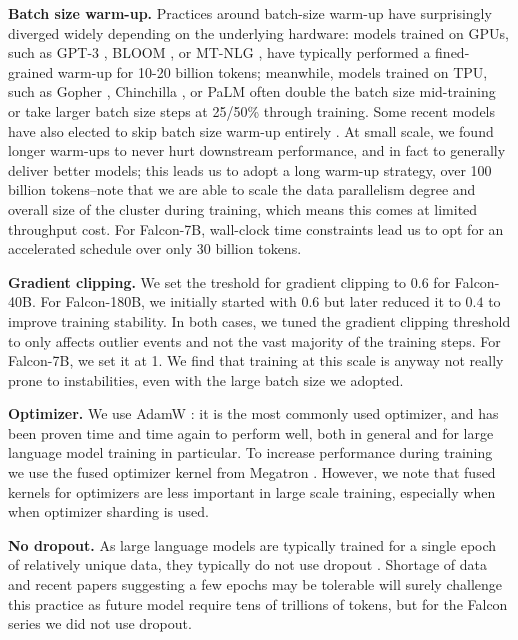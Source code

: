 \documentclass{article}
\begin{document}
\textbf{Batch size warm-up.} Practices around batch-size warm-up have surprisingly diverged widely depending on the underlying hardware: models trained on GPUs, such as GPT-3 \citep{brown2020gpt3}, BLOOM \citep{bloom}, or MT-NLG \citep{smith2022using}, have typically performed a fined-grained warm-up for 10-20 billion tokens; meanwhile, models trained on TPU, such as Gopher \citep{gopher}, Chinchilla \citep{hoffmann2022training}, or PaLM \citep{palm} often double the batch size mid-training or take larger batch size steps at 25/50\% through training. Some recent models have also elected to skip batch size warm-up entirely \citep{zhang2022opt, llama, llama2}. At small scale, we found longer warm-ups to never hurt downstream performance, and in fact to generally deliver better models; this leads us to adopt a long warm-up strategy, over 100 billion tokens--note that we are able to scale the data parallelism degree and overall size of the cluster during training, which means this comes at limited throughput cost. For Falcon-7B, wall-clock time constraints lead us to opt for an accelerated schedule over only 30 billion tokens.

\textbf{Gradient clipping.} We set the treshold for gradient clipping to $0.6$ for Falcon-40B. For Falcon-180B, we initially started with $0.6$ but later reduced it to $0.4$ to improve training stability. In both cases, we tuned the gradient clipping threshold to only affects outlier events and not the vast majority of the training steps. For Falcon-7B, we set it at 1. We find that training at this scale is anyway not really prone to instabilities, even with the large batch size we adopted.

\textbf{Optimizer.} We use AdamW \citep{adamW}: it is the most commonly used optimizer, and has been proven time and time again to perform well, both in general and for large language model training in particular. To increase performance during training we use the fused optimizer kernel from Megatron \cite{megatron-1}. However, we note that fused kernels for optimizers are less important in large scale training, especially when when optimizer sharding is used.

\textbf{No dropout.} As large language models are typically trained for a single epoch of relatively unique data, they typically do not use dropout \citep{dropout}. Shortage of data and recent papers suggesting a few epochs may be tolerable \citep{token_crisis} will surely challenge this practice as future model require tens of trillions of tokens, but for the Falcon series we did not use dropout.
\end{document}
